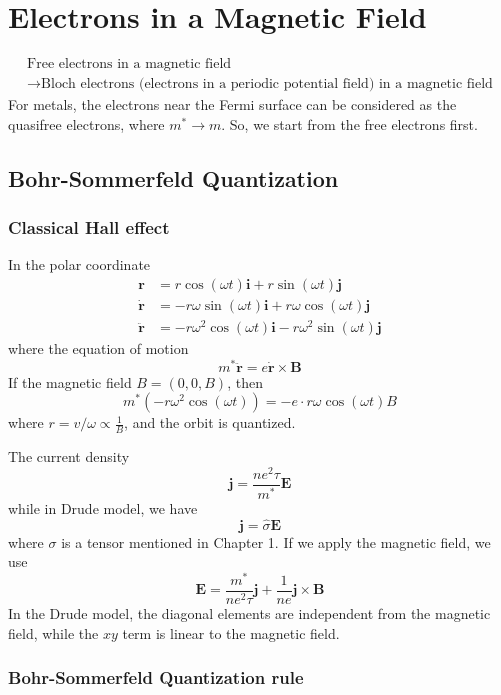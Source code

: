 
\chapter{Electrons in a Magnetic Field}

\begin{multline*}
  \text{Free electrons in a magnetic field} \\ \longrightarrow
  \text{Bloch electrons (electrons in a periodic potential field) in a
    magnetic field}
\end{multline*}
For metals, the electrons near the Fermi surface can be considered as the
quasifree electrons, where $m^* \to m$.
So, we start from the free electrons first.

\section{Bohr-Sommerfeld Quantization}

\subsection{Classical Hall effect}

In the polar coordinate
\begin{align*}
  \bm r & = r\cos(\omega t)\bm i + r\sin(\omega t)\bm j\\
  \bm{\dot r} & = -r\omega\sin(\omega t)\bm i + r\omega\cos(\omega t)\bm j\\
  \bm{\ddot r} & = -r\omega^2\cos(\omega t)\bm i - r\omega^2\sin(\omega t)\bm j
\end{align*}
where the equation of motion
\[
  m^*\bm{\ddot r} = e\bm{\dot r}\times\bm B
\]
If the magnetic field $B = (0, 0, B)$, then
\[
  m^*(-r\omega^2\cos(\omega t)) = -e\cdot r\omega\cos(\omega t) B
\]
where $r = v/\omega \propto \frac1B$, and the orbit is quantized.

The current density
\[
  \bm j = \frac{ne^2\tau}{m^*}\bm E
\]
while in Drude model, we have
\[
  \bm j = \hat \sigma \bm E
\]
where $\sigma$ is a tensor mentioned in Chapter 1.
If we apply the magnetic field, we use
\[
  \bm E = \frac{m^*}{ne^2\tau}\bm j + \frac1{ne}\bm j \times \bm B
\]
In the Drude model, the diagonal elements are independent from the magnetic
field, while the $xy$ term is linear to the magnetic field.

\subsection{Bohr-Sommerfeld Quantization rule}

